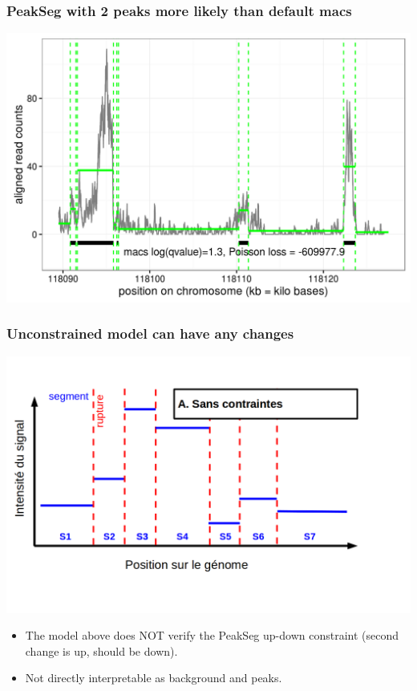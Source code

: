 \documentclass{beamer}
\begin{document}
\begin{frame}
  \frametitle{PeakSeg with 2 peaks more likely than default macs}
  \includegraphics[width=1\textwidth]{figure-macs-problem-1-30103.png}
\end{frame}

\begin{frame}
  \frametitle{Unconstrained model can have any changes}
  \includegraphics[width=1\textwidth]{Seg_SansC.png}
  \vskip -1cm
  \begin{itemize}
  \item The model above does NOT verify the PeakSeg up-down constraint
    (second change is up, should be down).
  \item Not directly interpretable as background and peaks.
  \end{itemize}
\end{frame}
\end{document}
